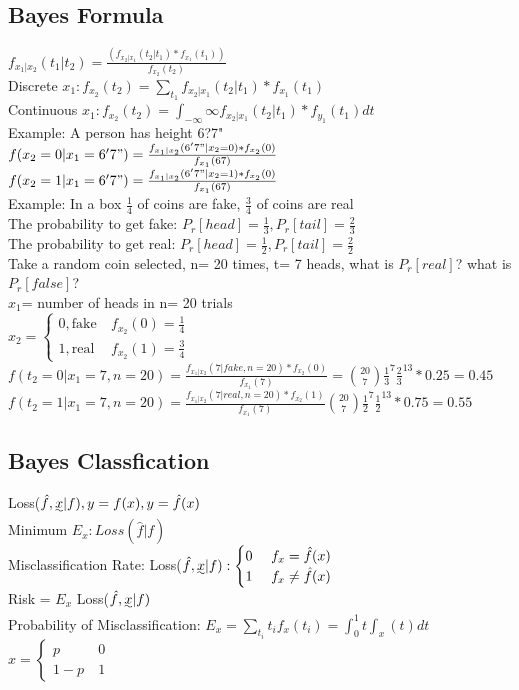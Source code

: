 \documentclass{article}
\begin{document}
\subsection{Bayes Formula} 
$f_{x_1|x_2}(t_1|t_2)= \frac{ (f_{x_2|x_1}(t_2|t_1)*f_{x_1}(t_1))} {f_{x_2}(t_2)}$
\\Discrete $x_1: f_{x_2}(t_2)= \sum_{t_1}f_{x_2|x_1}(t_2|t_1)*f_{x_1}(t_1)$
\\Continuous $x_1: f_{x_2}(t_2)= \int_{-\infty}{\infty}f_{x_2|x_1}(t_2|t_1)*f_{y_1}(t_1)dt$
\\Example: A person has height 6?7"
\\$f(x_2= 0| x_1=6'7")=\frac{ f_{x_1|x_2}(6'7"|x_2= 0)*f_{x_2}(0)}{f_{x_1}(67)}$
\\$f(x_2= 1| x_1=6'7")=\frac{ f_{x_1|x_2}(6'7"|x_2= 1)*f_{x_2}(0)}{f_{x_1}(67)}$
\\Example: In a box $\frac{1}{4}$ of coins are fake, $\frac{3}{4} $ of coins are real
\\The probability to get fake: $P_r[head]= \frac{1}{3}, P_r[tail]= \frac{2}{3} $
\\The probability to get real: $P_r[head]= \frac{1}{2}, P_r[tail]= \frac{2}{2} $
\\Take a random coin selected, n= 20 times, t= 7 heads, what is $P_r[real]$? what is $P_r[false]$?
\\$x_1$= number of heads in n= 20 trials
\\$x_2= \begin{cases} 0, \text{fake}  &\  f_{x_2}(0)=\frac{1}{4} \\ 
	1, \text{real}  &\  f_{x_2}(1)=\frac{3}{4} \end{cases}$
\\$f(t_2= 0| x_1=7, n= 20)=\frac{f_{x_1|x_2}(7|fake, n= 20)*f_{x_2}(0)}{f_{x_1}(7)}= {20\choose 7}\frac{1}{3}^7\frac{2}{3}^13*0.25=0.45$
\\$f(t_2= 1|x_1=7, n= 20)=\frac{ f_{x_1|x_2}(7|real, n= 20)*f_{x_2}(1)}{f_{x_1}(7)}{20\choose 7}\frac{1}{2}^7\frac{1}{2}^13*0.75=0.55$	

\subsection{Bayes Classfication} 	
Loss($\hat{f}, \uwave{x}|f), y=f(x), y=\hat{f}(x)$ 
\\Minimum $E_x: Loss (\hat{f}|f)$
\\Misclassification Rate: Loss($\hat{f}, \uwave{x}|f): \begin{cases} 0 &\   f_x=\hat{f}(x) \\ 
	1 &\  f_x \ne \hat{f}(x) \end{cases}$
\\Risk = $E_x$ Loss($\hat{f}, \uwave{x}|f)$
\\Probability of Misclassification: $E_x= \sum_{t_i}t_if_x(t_i)= \int_{0}^{1}t\int_{x}(t)dt$
\\$x= \begin{cases} p  &\ 0 \\ 
	1-p &\ 1 \end{cases}$
	
\end{document}
